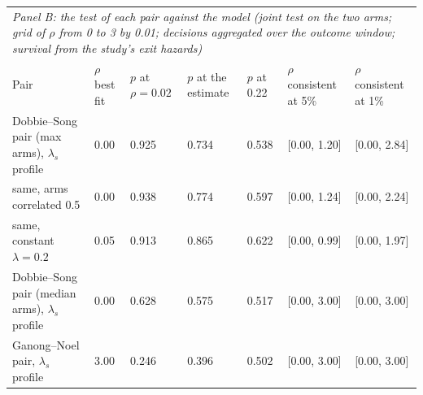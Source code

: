 \begin{tabular}{lllllll}
\midrule
\multicolumn{7}{l}{\textit{Panel B: the test of each pair against the model (joint test on the two arms; grid of $\rho$ from 0 to 3 by 0.01; decisions aggregated over the outcome window; survival from the study's exit hazards)}} \\
Pair & $\rho$ best fit & $p$ at $\rho = 0.02$ & $p$ at the estimate & $p$ at 0.22 & $\rho$ consistent at 5\% & $\rho$ consistent at 1\% \\
\midrule
Dobbie--Song pair (max arms), $\lambda_s$ profile & 0.00 & 0.925 & 0.734 & 0.538 & [0.00, 1.20] & [0.00, 2.84] \\
\quad same, arms correlated 0.5 & 0.00 & 0.938 & 0.774 & 0.597 & [0.00, 1.24] & [0.00, 2.24] \\
\quad same, constant $\lambda = 0.2$ & 0.05 & 0.913 & 0.865 & 0.622 & [0.00, 0.99] & [0.00, 1.97] \\
Dobbie--Song pair (median arms), $\lambda_s$ profile & 0.00 & 0.628 & 0.575 & 0.517 & [0.00, 3.00] & [0.00, 3.00] \\
Ganong--Noel pair, $\lambda_s$ profile & 3.00 & 0.246 & 0.396 & 0.502 & [0.00, 3.00] & [0.00, 3.00] \\
\bottomrule
\end{tabular}